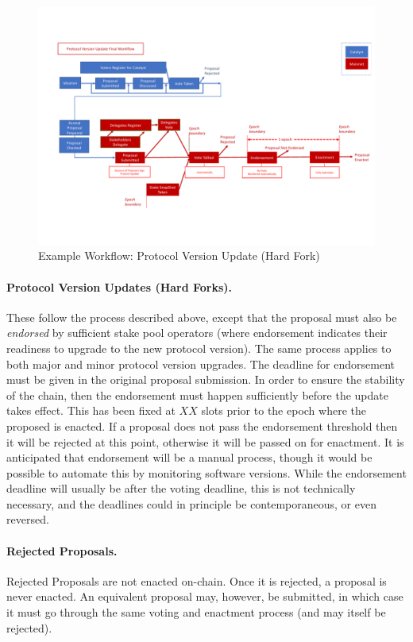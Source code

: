 \begin{figure}
  \includegraphics[trim=0 90 0 80,clip,width=\textwidth]{Workflow2}
  \caption{Example Workflow: Protocol Version Update (Hard Fork)}
  \label{fig:workflow-hf}
\end{figure}

\paragraph{Protocol Version Updates (Hard Forks).}  These follow the process described above,
except that the proposal must also be \emph{endorsed} by sufficient stake pool operators
(where endorsement indicates their readiness to upgrade to the new protocol version).
The same process applies to both major and minor protocol version upgrades.
The deadline for endorsement must be given in the original proposal submission.
In order to ensure the stability of the chain, then the endorsement must happen sufficiently before the update takes
effect.  This has been fixed at $XX$ slots prior to the epoch where the proposed is enacted.
If a proposal does not pass the endorsement threshold then it will be rejected at this point, otherwise it will be
passed on for enactment.  It is anticipated that endorsement will be a manual process, though it would be possible
to automate this by monitoring software versions.
While the endorsement deadline will usually be after the voting deadline, this is not technically necessary, and the deadlines could
in principle be contemporaneous, or even reversed.

\paragraph{Rejected Proposals.}  Rejected Proposals are not enacted on-chain.   Once it is rejected, a proposal is never enacted.
An equivalent proposal may, however, be submitted, in which case it must go through the same voting and enactment process
(and may itself be rejected).


